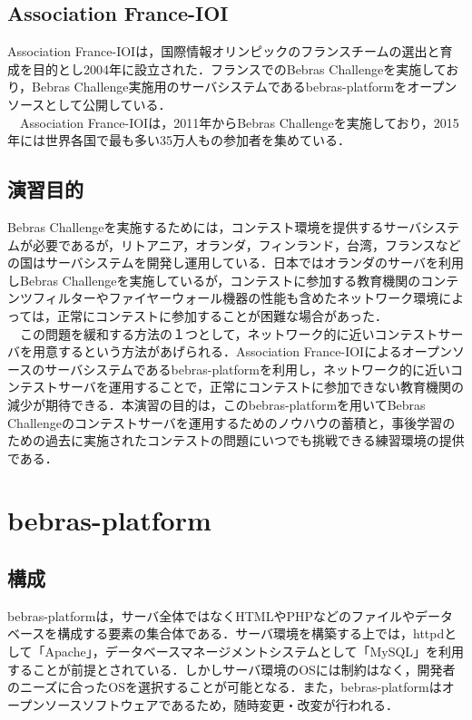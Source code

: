\documentclass[a4paper]{jarticle}
\begin{document}
\begin{multicols}{2}
\subsection{Association France-IOI}
Association France-IOIは，国際情報オリンピックのフランスチームの選出と育成を目的とし2004年に設立された．フランスでのBebras Challengeを実施しており，Bebras Challenge実施用のサーバシステムであるbebras-platformをオープンソースとして公開している．
\\　Association France-IOIは，2011年からBebras Challengeを実施しており，2015年には世界各国で最も多い35万人もの参加者を集めている．
\subsection{演習目的}
Bebras Challengeを実施するためには，コンテスト環境を提供するサーバシステムが必要であるが，リトアニア，オランダ，フィンランド，台湾，フランスなどの国はサーバシステムを開発し運用している．日本ではオランダのサーバを利用しBebras Challengeを実施しているが，コンテストに参加する教育機関のコンテンツフィルターやファイヤーウォール機器の性能も含めたネットワーク環境によっては，正常にコンテストに参加することが困難な場合があった．
\\　この問題を緩和する方法の１つとして，ネットワーク的に近いコンテストサーバを用意するという方法があげられる．Association France-IOIによるオープンソースのサーバシステムであるbebras-platformを利用し，ネットワーク的に近いコンテストサーバを運用することで，正常にコンテストに参加できない教育機関の減少が期待できる．本演習の目的は，このbebras-platformを用いてBebras Challengeのコンテストサーバを運用するためのノウハウの蓄積と，事後学習のための過去に実施されたコンテストの問題にいつでも挑戦できる練習環境の提供である．

\section{bebras-platform}


\subsection{構成}
bebras-platformは，サーバ全体ではなくHTMLやPHPなどのファイルやデータベースを構成する要素の集合体である．サーバ環境を構築する上では，httpdとして「Apache」，データベースマネージメントシステムとして「MySQL」を利用することが前提とされている．しかしサーバ環境のOSには制約はなく，開発者のニーズに合ったOSを選択することが可能となる．また，bebras-platformはオープンソースソフトウェアであるため，随時変更・改変が行われる．


\end{multicols}
\end{document}
